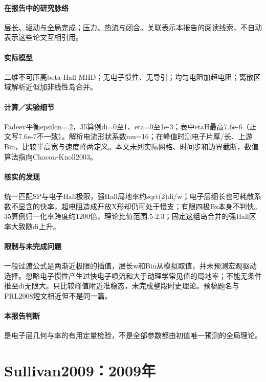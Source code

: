 \documentclass[UTF8,a4paper,11pt,openany,fontset=fandol]{ctexbook}
\begin{document}
\paragraph{在报告中的研究脉络}\hyperref[story:global]{层长、驱动与全局完成}；\hyperref[story:closure]{压力、热流与闭合}。关联表示本报告的阅读线索，不自动表示这些论文互相引用。

\paragraph{实际模型}二维不可压高beta Hall MHD；无电子惯性、无导引；均匀电阻加超电阻；离散区域解析近似加非线性岛合并。

\paragraph{计算／实验细节}Fadeev平衡epsilon=.2，35算例di=0至1、eta=0至1e-3；表中etaH最高7.6e-6（正文写7.6e-7不一致）。解析电流形状系数mu=16；在峰值时测电子片厚/长、上游Bin，比较半高宽与速度峰两定义。本文未列实际网格、时间步和边界截断，数值算法指向Chacon-Knoll2003。

\paragraph{核实的发现}统一匹配SP与电子Hall极限，强Hall局地率约sqrt(2)di/w；电子层细长也可耗散系数不显含的快率，超电阻造成开放X形却仍可处于慢支；有限四极Bz本身不判快。35算例归一化率跨度约1200倍，理论比值范围.5-2.3；固定这组岛合并的强Hall区率大致随di上升。

\paragraph{限制与未完成问题}一般过渡公式是两渐近极限的插值，层长w和Bin从模拟取值，并未预测宏观驱动选择。忽略电子惯性产生过快电子喷流和大于动理学常见值的局地率；不能无条件推至di无限大。只比较峰值附近准稳态，未完成整段时史理论。预稿题名与PRL2008短文相近但不是同一篇。

\paragraph{本报告判断}是电子层几何与率的有用定量检验，不是全部参数都由初值唯一预测的全局理论。

\section{Sullivan2009：2009年}\label{paper:Sullivan2009}
\end{document}
